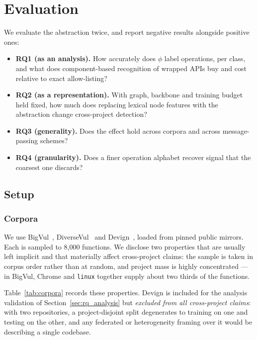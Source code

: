 \section{Evaluation}
\label{sec:experiment}
\label{sec:results}

We evaluate the abstraction twice, and report negative results alongside
positive ones:

\begin{itemize}
    \item \textbf{RQ1 (as an analysis).} How accurately does $\phi$ label
          operations, per class, and what does component-based recognition of
          wrapped APIs buy and cost relative to exact allow-listing?
    \item \textbf{RQ2 (as a representation).} With graph, backbone and
          training budget held fixed, how much does replacing lexical node
          features with the abstraction change cross-project detection?
    \item \textbf{RQ3 (generality).} Does the effect hold across corpora and
          across message-passing schemes?
    \item \textbf{RQ4 (granularity).} Does a finer operation alphabet recover
          signal that the coarsest one discards?
\end{itemize}

\subsection{Setup}

\subsubsection{Corpora}
We use BigVul~\cite{fan2020bigvul}, DiverseVul~\cite{chen2023diversevul} and
Devign~\cite{zhou2019devign}, loaded from pinned public mirrors. Each is
sampled to 8{,}000 functions. We disclose two properties that are usually left
implicit and that materially affect cross-project claims: the sample is taken
in corpus order rather than at random, and project mass is highly
concentrated --- in BigVul, Chrome and \texttt{linux} together supply about
two thirds of the functions.



Table~\ref{tab:corpora} records these properties. Devign is included for the
analysis validation of Section~\ref{sec:rq_analysis} but \emph{excluded from
all cross-project claims}: with two repositories, a project-disjoint split
degenerates to training on one and testing on the other, and any federated or
heterogeneity framing over it would be describing a single codebase.

